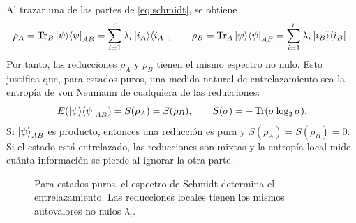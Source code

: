 \documentclass[../main.tex]{subfiles}
\begin{document}
Al trazar una de las partes de \eqref{eq:schmidt}, se obtiene
\begin{equation*}
    \rho_A=\Tr_B\ket{\psi}\!\bra{\psi}_{AB}
    =\sum_{i=1}^{r}\lambda_i\ket{i_A}\!\bra{i_A},
    \qquad
    \rho_B=\Tr_A\ket{\psi}\!\bra{\psi}_{AB}
    =\sum_{i=1}^{r}\lambda_i\ket{i_B}\!\bra{i_B}.
\end{equation*}
Por tanto, las reducciones \(\rho_A\) y \(\rho_B\) tienen el mismo espectro no nulo. Esto justifica que, para estados puros, una medida natural de entrelazamiento sea la entropía de von Neumann de cualquiera de las reducciones:
\begin{equation}
    E(\ket{\psi}\!\bra{\psi}_{AB})
    =S(\rho_A)
    =S(\rho_B),
    \qquad
    S(\sigma)=-\Tr(\sigma\log_2\sigma).
    \label{eq:entropia-entrelazamiento-puros}
\end{equation}
Si \(\ket{\psi}_{AB}\) es producto, entonces una reducción es pura y \(S(\rho_A)=S(\rho_B)=0\). Si el estado está entrelazado, las reducciones son mixtas y la entropía local mide cuánta información se pierde al ignorar la otra parte.

\begin{figure}[H]
\centering
\shorthandoff{<>}
\shorthandon{<>}
\caption{Para estados puros, el espectro de Schmidt determina el entrelazamiento. Las reducciones locales tienen los mismos autovalores no nulos \(\lambda_i\).}
\label{fig:schmidt-entrelazamiento}
\end{figure}
\end{document}
